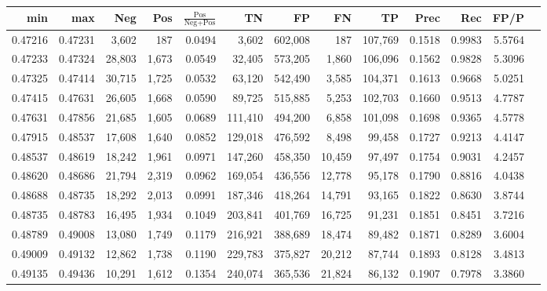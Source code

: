 \begin{tabular}{rrrrrrrrrrrrr}
\toprule
    min &     max &    Neg &   Pos & $\frac{\text{Pos}}{\text{Neg}+\text{Pos}}$ &      TN &      FP &      FN &      TP &   Prec &    Rec &   FP/P \\
\midrule
0.47216 & 0.47231 &  3,602 &   187 &                                     0.0494 &   3,602 & 602,008 &     187 & 107,769 & 0.1518 & 0.9983 & 5.5764 \\
0.47233 & 0.47324 & 28,803 & 1,673 &                                     0.0549 &  32,405 & 573,205 &   1,860 & 106,096 & 0.1562 & 0.9828 & 5.3096 \\
0.47325 & 0.47414 & 30,715 & 1,725 &                                     0.0532 &  63,120 & 542,490 &   3,585 & 104,371 & 0.1613 & 0.9668 & 5.0251 \\
0.47415 & 0.47631 & 26,605 & 1,668 &                                     0.0590 &  89,725 & 515,885 &   5,253 & 102,703 & 0.1660 & 0.9513 & 4.7787 \\
0.47631 & 0.47856 & 21,685 & 1,605 &                                     0.0689 & 111,410 & 494,200 &   6,858 & 101,098 & 0.1698 & 0.9365 & 4.5778 \\
0.47915 & 0.48537 & 17,608 & 1,640 &                                     0.0852 & 129,018 & 476,592 &   8,498 &  99,458 & 0.1727 & 0.9213 & 4.4147 \\
0.48537 & 0.48619 & 18,242 & 1,961 &                                     0.0971 & 147,260 & 458,350 &  10,459 &  97,497 & 0.1754 & 0.9031 & 4.2457 \\
0.48620 & 0.48686 & 21,794 & 2,319 &                                     0.0962 & 169,054 & 436,556 &  12,778 &  95,178 & 0.1790 & 0.8816 & 4.0438 \\
0.48688 & 0.48735 & 18,292 & 2,013 &                                     0.0991 & 187,346 & 418,264 &  14,791 &  93,165 & 0.1822 & 0.8630 & 3.8744 \\
0.48735 & 0.48783 & 16,495 & 1,934 &                                     0.1049 & 203,841 & 401,769 &  16,725 &  91,231 & 0.1851 & 0.8451 & 3.7216 \\
0.48789 & 0.49008 & 13,080 & 1,749 &                                     0.1179 & 216,921 & 388,689 &  18,474 &  89,482 & 0.1871 & 0.8289 & 3.6004 \\
0.49009 & 0.49132 & 12,862 & 1,738 &                                     0.1190 & 229,783 & 375,827 &  20,212 &  87,744 & 0.1893 & 0.8128 & 3.4813 \\
0.49135 & 0.49436 & 10,291 & 1,612 &                                     0.1354 & 240,074 & 365,536 &  21,824 &  86,132 & 0.1907 & 0.7978 & 3.3860 \\

\end{tabular}
